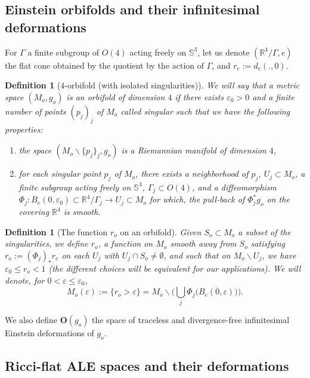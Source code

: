 \documentclass[11pt,reqno]{amsart}
\numberwithin{equation}{section}
\newtheorem{defn}[thm]{Definition}
\theoremstyle{definition}
\theoremstyle{remark}
\begin{document}
\subsection{Einstein orbifolds and their infinitesimal deformations}

For $\Gamma$ a finite subgroup of $O(4)$ acting freely on $\mathbb{S}^3$, let us denote $(\mathbb{R}^4\slash\Gamma,e)$ the flat cone obtained by the quotient by the action of $\Gamma$, and $r_e:= d_e(.,0)$.

\begin{defn}[$4$-orbifold (with isolated singularities)]\label{orb Ein}
    We will say that a metric space $(M_o,g_o)$ is an orbifold of dimension $4$ if there exists $\varepsilon_0>0$ and a finite number of points $(p_j)_j$ of $M_o$ called \emph{singular} such that we have the following properties:
    \begin{enumerate}
        \item the space $(M_o\backslash\{p_j\}_j,g_o)$ is a Riemannian manifold of dimension $4$,
        \item for each singular point $p_j$ of $M_o$, there exists a neighborhood of $p_j$, $ U_j\subset M_o$, a finite subgroup acting freely on $\mathbb{S}^3$, $\Gamma_j\subset O(4)$, and a diffeomorphism $ \Phi_j: B_e(0,\varepsilon_0)\subset\mathbb{R}^4\slash\Gamma_j \to U_j\subset M_o $ for which, the pull-back of $\Phi_j^*g_o$  on the covering $\mathbb{R}^4$ is smooth.
    \end{enumerate}
\end{defn}

\begin{defn}[The function $r_o$ on an orbifold]\label{ro}
    Given $S_o\subset M_o$ a subset of the singularities, we define $r_o$, a function on $M_o$ { smooth away from $S_o$} satisfying $r_o:= (\Phi_j)_* r_e$ on each $U_j$ with $U_j\cap S_o\neq \emptyset$, and such that on $M_o\backslash U_j$, we have $\varepsilon_0\leqslant r_o<1$ (the different choices will be equivalent for our applications). We will denote, for $0<\varepsilon\leqslant\varepsilon_0$, $$M_o(\varepsilon):= \{r_o>\varepsilon\} = M_o\backslash  \Big(\bigcup_j \Phi_j\Big(\overline{B_e(0,\varepsilon)}\Big) \Big).$$
\end{defn}
We also define $\mathbf{O}(g_o)$ the space of traceless and divergence-free infinitesimal Einstein deformations of $g_o$. 

\subsection{Ricci-flat ALE spaces and their deformations}
\end{document}
